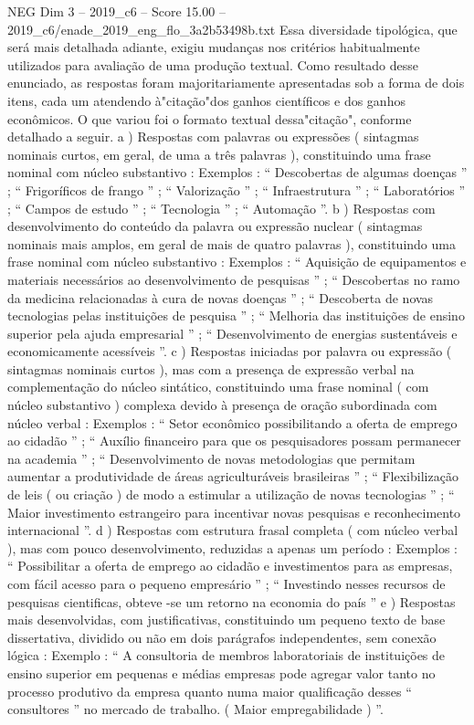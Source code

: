 \begin{textsample}{NEG Dim 3 – 2019\_c6 – Score 15.00 – 2019\_c6/enade\_2019\_eng\_flo\_3a2b53498b.txt}
Essa diversidade tipológica, que será mais detalhada adiante, exigiu mudanças nos critérios habitualmente utilizados para avaliação de uma produção textual.
Como resultado desse enunciado, as respostas foram majoritariamente apresentadas sob a forma de dois itens, cada um atendendo à"citação"dos ganhos científicos e dos ganhos econômicos.
O que variou foi o formato textual dessa"citação", conforme detalhado a seguir. a ) Respostas com palavras ou expressões ( sintagmas nominais curtos, em geral, de uma a três palavras ), constituindo uma frase nominal com núcleo substantivo : Exemplos : “ Descobertas de algumas doenças ” ; “ Frigoríficos de frango ” ; “ Valorização ” ; “ Infraestrutura ” ; “ Laboratórios ” ; “ Campos de estudo ” ; “ Tecnologia ” ; “ Automação ”. b ) Respostas com desenvolvimento do conteúdo da palavra ou expressão nuclear ( sintagmas nominais mais amplos, em geral de mais de quatro palavras ), constituindo uma frase nominal com núcleo substantivo : Exemplos : “ Aquisição de equipamentos e materiais necessários ao desenvolvimento de pesquisas ” ; “ Descobertas no ramo da medicina relacionadas à cura de novas doenças ” ; “ Descoberta de novas tecnologias pelas instituições de pesquisa ” ; “ Melhoria das instituições de ensino superior pela ajuda empresarial ” ; “ Desenvolvimento de energias sustentáveis e economicamente acessíveis ”. c ) Respostas iniciadas por palavra ou expressão ( sintagmas nominais curtos ), mas com a presença de expressão verbal na complementação do núcleo sintático, constituindo uma frase nominal ( com núcleo substantivo ) complexa devido à presença de oração subordinada com núcleo verbal : Exemplos : “ Setor econômico possibilitando a oferta de emprego ao cidadão ” ; “ Auxílio financeiro para que os pesquisadores possam permanecer na academia ” ; “ Desenvolvimento de novas metodologias que permitam aumentar a produtividade de áreas agriculturáveis brasileiras ” ; “ Flexibilização de leis ( ou criação ) de modo a estimular a utilização de novas tecnologias ” ; “ Maior investimento estrangeiro para incentivar novas pesquisas e reconhecimento internacional ”. d ) Respostas com estrutura frasal completa ( com núcleo verbal ), mas com pouco desenvolvimento, reduzidas a apenas um período : Exemplos : “ Possibilitar a oferta de emprego ao cidadão e investimentos para as empresas, com fácil acesso para o pequeno empresário ” ; “ Investindo nesses recursos de pesquisas cientificas, obteve -se um retorno na economia do país ” e ) Respostas mais desenvolvidas, com justificativas, constituindo um pequeno texto de base dissertativa, dividido ou não em dois parágrafos independentes, sem conexão lógica : Exemplo : “ A consultoria de membros laboratoriais de instituições de ensino superior em pequenas e médias empresas pode agregar valor tanto no processo produtivo da empresa quanto numa maior qualificação desses “ consultores ” no mercado de trabalho. ( Maior empregabilidade ) ”.

\end{textsample}
